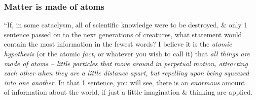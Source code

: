 \documentclass{article}
\begin{document}
\subsubsection{Matter is made of atoms}
``If, in some cataclysm, all of scientific knowledge were to be destroyed, \& only 1 sentence passed on to the next generations of creatures, what statement would contain the most information in the fewest words? I believe it is the {\it atomic hypothesis} (or the atomic {\it fact}, or whatever you wish to call it) that {\it all things are made of atoms -- little particles that move around in perpetual motion, attracting each other when they are a little distance apart, but repelling upon being squeezed into one another}. In that 1 sentence, you will see, there is an {\it enormous} amount of information about the world, if just a little imagination \& thinking are applied.
\end{document}

